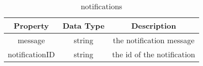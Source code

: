 \documentclass[12pt, letterpaper]{article}
\begin{document}
    \begin{table}[ht]
      \centering
      \caption{notifications}
      \begin{tabular}{||c c c||} 
        \hline
        Property & Data Type & Description\\ [0.1ex] 
        \hline\hline
        message & string & the notification message\\
        notificationID & string & the id of the notification\\
        \hline
      \end{tabular}
      \label{table:data}
    \end{table}
\end{document}
